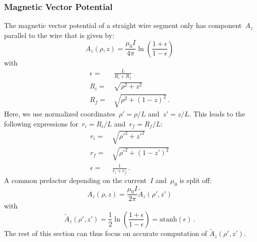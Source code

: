 \subsubsection{Magnetic Vector Potential}
The magnetic vector potential of a straight wire segment
only has component~$A_z$ parallel to the wire that is given by:
\begin{equation}
  A_z(\rho, z) = \frac{\mu_0 I}{4 \pi} \ln \left( \frac{1+\epsilon}{1 - \epsilon} \right)
\end{equation}
with
\begin{align}
  \epsilon =&\, \frac{L}{R_i + R_f} \\
       R_i =&\, \sqrt{\rho^2 + z^2} \\
       R_f =&\, \sqrt{\rho^2 + (1-z)^2} \, .
\end{align}
Here, we use normalized coordinates~$\rho' = \rho/L$ and~$z' = z/L$.
This leads to the following expressions for~$r_i = R_i/L$ and~$r_f = R_f/L$:
\begin{align}
  r_i =&\, \sqrt{{\rho'}^2 +      {z'}^2 } \label{eqn:r_i_default} \\
  r_f =&\, \sqrt{{\rho'}^2 + (1 - {z'})^2} \label{eqn:r_f_default} \\
  \epsilon =&\, \frac{1}{r_i + r_f} \, .
\end{align}
A common prefactor depending on the current~$I$ and~$\mu_0$ is split off:
\begin{equation}
  A_z(\rho, z) = \frac{\mu_0 I}{2 \pi} \tilde{A}_z (\rho', z')
\end{equation}
with
\begin{equation}
  \tilde{A}_z (\rho', z')
  = \frac{1}{2} \ln \left( \frac{1+\epsilon}{1 - \epsilon} \right)
  = \textrm{atanh} (\epsilon) \, .
  \label{eqn:A_z_tilde}
\end{equation}
The rest of this section can thus focus on accurate computation of $\tilde{A}_z (\rho', z')$.

